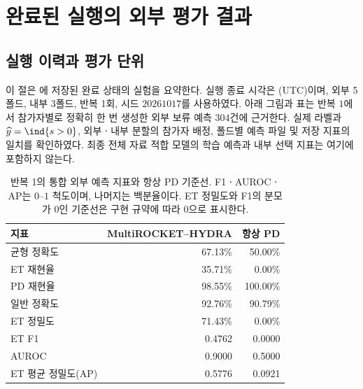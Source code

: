 


\clearpage
\section{완료된 실행의 외부 평가 결과}\label{sec:observed-results}
\subsection{실행 이력과 평가 단위}
이 절은 에 저장된 완료 상태의 실험을 요약한다.
실행 종료 시각은  (UTC)이며,
외부 5폴드, 내부 3폴드, 반복 1회,
시드 \(20261017\)를 사용하였다.
아래 그림과 표는 반복 \(1\)에서 참가자별로 정확히 한 번 생성한
외부 보류 예측 \(304\)건에 근거한다.
실제 라벨과 \(\widehat y=\ind\{s>0\}\), 외부ㆍ내부 분할의 참가자 배정,
폴드별 예측 파일 및 저장 지표의 일치를 확인하였다.
최종 전체 자료 적합 모델의 학습 예측과 내부 선택 지표는 여기에 포함하지 않는다.

\begin{table}[H]
\centering\small
\caption{반복 1의 통합 외부 예측 지표와 항상 PD 기준선.
F1ㆍAUROCㆍAP는 \(0\)--\(1\) 척도이며, 나머지는 백분율이다.
ET 정밀도와 F1의 분모가 \(0\)인 기준선은 구현 규약에 따라 \(0\)으로 표시한다.}
\label{tab:observed-metrics}
\begin{tabular}{@{}lrr@{}}
\toprule 지표 & MultiROCKET--HYDRA & 항상 PD\\ \midrule
균형 정확도 & 67.13\% & 50.00\%\\
ET 재현율 & 35.71\% & 0.00\%\\
PD 재현율 & 98.55\% & 100.00\%\\
일반 정확도 & 92.76\% & 90.79\%\\
ET 정밀도 & 71.43\% & 0.00\%\\
ET F1 & 0.4762 & 0.0000\\
AUROC & 0.9000 & 0.5000\\
ET 평균 정밀도(AP) & 0.5776 & 0.0921\\

\bottomrule
\end{tabular}
\end{table}

